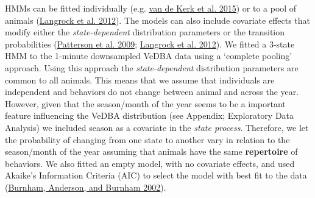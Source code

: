 \documentclass[english,msc,numbers,hidelinks]{coppe}
\begin{document}
  HMMs can be fitted individually (e.g. \protect\hyperlink{ref-vandekerk2015}{van de Kerk et al. 2015}) or to a pool of animals (\protect\hyperlink{ref-langrock2012}{Langrock et al. 2012}). The models can also include covariate effects that modify either the \emph{state-dependent} distribution parameters or the transition probabilities (\protect\hyperlink{ref-patterson2009}{Patterson et al. 2009}; \protect\hyperlink{ref-langrock2012}{Langrock et al. 2012}). We fitted a 3-state HMM to the 1-minute downsampled VeDBA data using a `complete pooling' approach. Using this approach the \emph{state-dependent} distribution parameters are common to all animals. This means that we assume that individuals are independent and behaviors do not change between animal and across the year. However, given that the season/month of the year seems to be a important feature influencing the VeDBA distribution (see Appendix; Exploratory Data Analysis) we included season as a covariate in the \emph{state process}. Therefore, we let the probability of changing from one state to another vary in relation to the season/month of the year assuming that animals have the same \textbf{repertoire} of behaviors. We also fitted an empty model, with no covariate effects, and used Akaike's Information Criteria (AIC) to select the model with best fit to the data (\protect\hyperlink{ref-burnham2002}{Burnham, Anderson, and Burnham 2002}).
\end{document}
